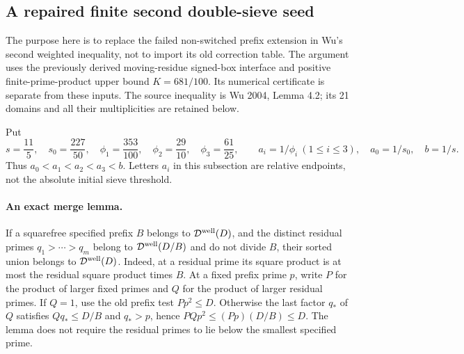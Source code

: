 \documentclass[11pt]{article}
\begin{document}
\subsection{A repaired finite second double-sieve seed}
\label{sec:replacement-second-seed}

The purpose here is to replace the failed non-switched prefix extension
in Wu's second weighted inequality, not to import its old correction
table.  The argument uses the previously derived moving-residue
signed-box interface and positive finite-prime-product upper bound
$K=681/100$.  Its numerical certificate is separate from these inputs.
The source inequality is Wu 2004, Lemma 4.2; its 21 domains and all
their multiplicities are retained below.

Put
\[
 s=\frac{11}{5},\quad s_0=\frac{227}{50},\quad
 \phi_1=\frac{353}{100},\quad\phi_2=\frac{29}{10},\quad
 \phi_3=\frac{61}{25},\qquad
 a_i=1/\phi_i\ (1\le i\le3),\quad a_0=1/s_0,\quad b=1/s.
\]
Thus $a_0<a_1<a_2<a_3<b$.  Letters $a_i$ in this subsection are
relative endpoints, not the absolute initial sieve threshold.

\paragraph{An exact merge lemma.}
If a squarefree specified prefix $B$ belongs to
$\mathcal D^{\rm well}(D)$, and the distinct residual primes
$q_1>\cdots>q_m$ belong to $\mathcal D^{\rm well}(D/B)$ and do
not divide $B$, their sorted union belongs to
$\mathcal D^{\rm well}(D)$.
Indeed, at a residual prime its square product is at most the
residual square product times $B$.  At a fixed prefix prime $p$,
write $P$ for the product of larger fixed primes and $Q$ for the
product of larger residual primes.  If $Q=1$, use the old prefix
test $Pp^2\le D$.  Otherwise the last factor $q_*$ of $Q$ satisfies
$Qq_*\le D/B$ and $q_*>p$, hence
$PQp^2\le(Pp)(D/B)\le D$.
The lemma does not require the residual primes to lie below the
smallest specified prime.
\end{document}

